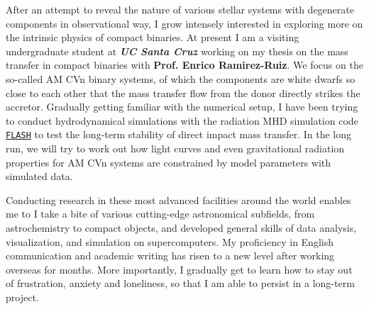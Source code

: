 \documentclass[11pt, a4paper]{awesome-cv} %
\begin{document}
\begin{cvletter}
After an attempt to reveal the nature of various stellar systems with degenerate components in observational way, I grow intensely interested in exploring more on the intrinsic physics of compact binaries. At present I am a visiting undergraduate student at \textbf{\textit{UC Santa Cruz}} working on my thesis on the mass transfer in compact binaries with \textbf{Prof. Enrico Ramirez-Ruiz}. We focus on the so-called AM CVn binary systems, of which the components are white dwarfs so close to each other that the mass transfer flow from the donor directly strikes the accretor. Gradually getting familiar with the numerical setup, I have been trying to conduct hydrodynamical simulations with the radiation MHD simulation code \href{http://flash.uchicago.edu/site/}{\texttt{FLASH}} to test the long-term stability of direct impact mass transfer. In the long run, we will try to work out how light curves and even gravitational radiation properties for AM CVn systems are constrained by model parameters with simulated data.

Conducting research in these most advanced facilities around the world enables me to I take a bite of various cutting-edge astronomical subfields, from astrochemistry to compact objects, and developed general skills of data analysis, visualization, and simulation on supercomputers. My proficiency in English communication and academic writing has risen to a new level after working overseas for months. More importantly, I gradually get to learn how to stay out of frustration, anxiety and loneliness, so that I am able to persist in a long-term project.

\end{cvletter}


\end{document}
